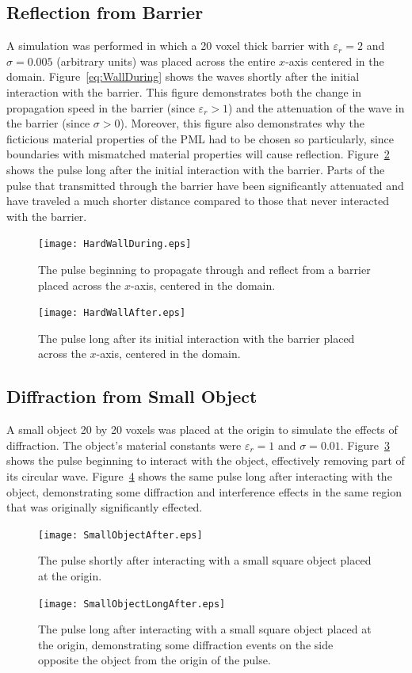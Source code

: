 \documentclass[12pt,twocolumn]{article}
\begin{document}
\subsection{Reflection from Barrier}
A simulation was performed in which a 20 voxel thick barrier with $\varepsilon_r=2$ and $\sigma=0.005$ (arbitrary units) was placed across the entire $x$-axis centered in the domain. Figure~\ref{eq:WallDuring} shows the waves shortly after the initial interaction with the barrier. This figure demonstrates both the change in propagation speed in the barrier (since $\varepsilon_r>1$) and the attenuation of the wave in the barrier (since $\sigma>0$). Moreover, this figure also demonstrates why the ficticious material properties of the PML had to be chosen so particularly, since boundaries with mismatched material properties will cause reflection. Figure~\ref{fig:WallAfter} shows the pulse long after the initial interaction with the barrier. Parts of the pulse that transmitted through the barrier have been significantly attenuated and have traveled a much shorter distance compared to those that never interacted with the barrier.
\begin{figure}
\centering
\texttt{[image: HardWallDuring.eps]}
\caption{The pulse beginning to propagate through and reflect from a barrier placed across the $x$-axis, centered in the domain.}
\label{fig:WallDuring}
\end{figure}
\begin{figure}
\centering
\texttt{[image: HardWallAfter.eps]}
\caption{The pulse long after its initial interaction with the barrier placed across the $x$-axis, centered in the domain.}
\label{fig:WallAfter}
\end{figure}
\subsection{Diffraction from Small Object}
A small object 20 by 20 voxels was placed at the origin to simulate the effects of diffraction. The object's material constants were $\varepsilon_r=1$ and $\sigma=0.01$. Figure~\ref{fig:SmallObjectAfter} shows the pulse beginning to interact with the object, effectively removing part of its circular wave. Figure~\ref{fig:SmallObjectLongAfter} shows the same pulse long after interacting with the object, demonstrating some diffraction and interference effects in the same region that was originally significantly effected.
\begin{figure}
\centering
\texttt{[image: SmallObjectAfter.eps]}
\caption{The pulse shortly after interacting with a small square object placed at the origin.}
\label{fig:SmallObjectAfter}
\end{figure}
\begin{figure}
\centering
\texttt{[image: SmallObjectLongAfter.eps]}
\caption{The pulse long after interacting with a small square object placed at the origin, demonstrating some diffraction events on the side opposite the object from the origin of the pulse.}
\label{fig:SmallObjectLongAfter}
\end{figure}
\end{document}
